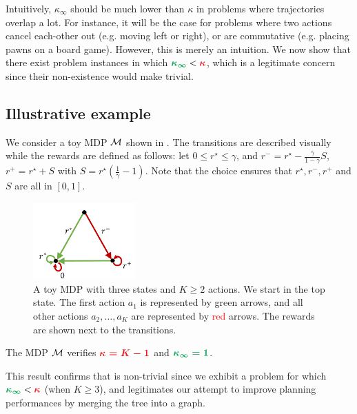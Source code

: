 \documentclass[runningheads]{llncs}
\begin{document}
Intuitively, $\kappa_\infty$ should be much lower than $\kappa$ in problems where trajectories overlap a lot. For instance, it will be the case for problems where two actions cancel each-other out (e.g. moving left or right), or are commutative (e.g. placing pawns on a board game). However, this is merely an intuition. We now show that there exist problem instances in which $\hlgb{\kappa_\infty} < \hlrb{\kappa}$, which is a legitimate concern since their non-existence would make  trivial.

\subsection{Illustrative example}

We consider a toy MDP $\mathcal{M}$ shown in . The transitions are described visually while the rewards are defined as follows: let $0\leq r^\star\leq \gamma$, and $ r^- = r^\star - \frac{\gamma}{1-\gamma} S$, $r^+ = r^\star + S$ with $S = r^\star\left(\frac{1}{\gamma} - 1\right).$ Note that the choice ensures that $r^\star, r^-, r^+$ and $S$ are all in $[0, 1]$.

\begin{figure}[htp]
    \centering
    \includegraphics[trim={0.5cm 0.0cm 0.3cm 0.6cm}, clip, width=0.35\textwidth]{img/mdp.pdf}
    \caption{A toy MDP with three states and $K \geq 2$ actions. We start in the top state. The first action $a_1$ is represented by \textcolor{OliveGreen}{green} arrows, and all other actions $a_2, \dots, a_K$ are represented by \textcolor{red}{red} arrows. The rewards are shown next to the transitions.}
    \label{fig:mdp}
\end{figure}

\begin{proposition}
\label{prop:illustrative-example}
The MDP $\mathcal{M}$ verifies $\hlrb{\kappa = K-1}$ and $\hlgb{\kappa_\infty = 1}$.
\end{proposition}
This result confirms that  is non-trivial since we exhibit a problem for which $\hlgb{\kappa_\infty} < \hlrb{\kappa}$ (when $K\geq 3$), and legitimates our attempt to improve planning performances by merging the tree into a graph.
\end{document}
